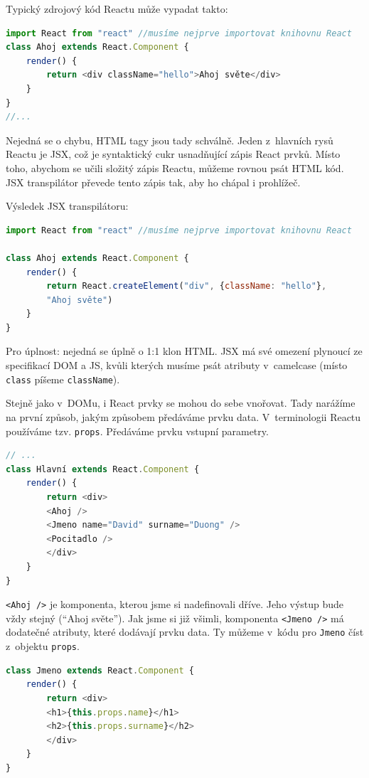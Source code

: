 \documentclass[a4paper,11pt,oneside]{article}
\begin{document}
\pagebreak
Typický zdrojový kód Reactu může vypadat takto:
\begin{lstlisting}[language=javascript, caption={JavaScript}]
import React from "react" //musíme nejprve importovat knihovnu React
class Ahoj extends React.Component {
	render() {
		return <div className="hello">Ahoj světe</div>
	}
}
//...
\end{lstlisting}

Nejedná se o chybu, HTML tagy jsou tady schválně. Jeden z~hlavních rysů Reactu je JSX, což je syntaktický cukr usnadňující zápis React prvků. Místo toho, abychom se učili složitý zápis Reactu, můžeme rovnou psát HTML kód. JSX transpilátor převede tento zápis tak, aby ho chápal i prohlížeč. 

Výsledek JSX transpilátoru:

\begin{lstlisting}[language=javascript, caption={JavaScript}]
import React from "react" //musíme nejprve importovat knihovnu React

class Ahoj extends React.Component {
	render() {
		return React.createElement("div", {className: "hello"}, 
		"Ahoj světe")
	}
}
\end{lstlisting}

Pro úplnost: nejedná se úplně o 1:1 klon HTML. JSX má své omezení plynoucí ze specifikací DOM a JS, kvůli kterých musíme psát atributy v~camelcase (místo \lstinline|class| píšeme \lstinline|className|).

Stejně jako v~DOMu, i React prvky se mohou do sebe vnořovat. Tady narážíme na první způsob, jakým způsobem předáváme prvku data. V~terminologii Reactu používáme tzv. \lstinline|props|. Předáváme prvku vstupní parametry.

\pagebreak
\begin{lstlisting}[language=javascript, caption={JavaScript}]
// ...
class Hlavní extends React.Component {
	render() {
		return <div>
		<Ahoj />
		<Jmeno name="David" surname="Duong" />
		<Pocitadlo />
		</div>
	}
}
\end{lstlisting}

\lstinline|<Ahoj />| je komponenta, kterou jsme si nadefinovali dříve. Jeho výstup bude vždy stejný (\enquote{Ahoj světe}). Jak jsme si již všimli, komponenta \lstinline|<Jmeno />| má dodatečné atributy, které dodávají prvku data. Ty můžeme v~kódu pro \lstinline|Jmeno| číst z~objektu \lstinline|props|. 

\begin{lstlisting}[language=javascript, caption={JavaScript}]
class Jmeno extends React.Component {
	render() {
		return <div>
		<h1>{this.props.name}</h1>
		<h2>{this.props.surname}</h2>
		</div>
	}
}
\end{lstlisting}
\end{document}
